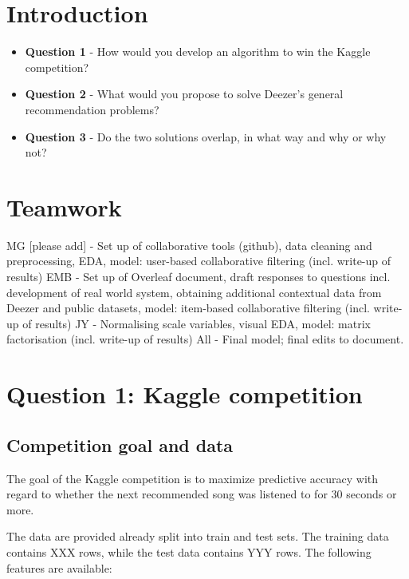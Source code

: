 \documentclass[
]{ceurart}
\begin{document}
\section{Introduction}



\begin{itemize}
    \item \textbf{Question 1} - How would you develop an algorithm to win the Kaggle competition?
    \item \textbf{Question 2} - What would you propose to solve Deezer's general recommendation problems?
    \item \textbf{Question 3} - Do the two solutions overlap, in what way and why or why not?
\end{itemize}


\section{Teamwork}

MG [please add] - Set up of collaborative tools (github), data cleaning and preprocessing, EDA, model: user-based collaborative filtering (incl. write-up of results)
EMB - Set up of Overleaf document, draft responses to questions incl. development of real world system, obtaining additional contextual data from Deezer and public datasets, model: item-based collaborative filtering (incl. write-up of results)
JY - Normalising scale variables, visual EDA, model: matrix factorisation (incl. write-up of results)
All - Final model; final edits to document.



\section{Question 1: Kaggle competition}

\subsection{Competition goal and data}

The goal of the Kaggle competition is to maximize predictive accuracy with regard to whether the next recommended song was listened to for 30 seconds or more.

The data are provided already split into train and test sets. The training data contains XXX rows, while the test data contains YYY rows. The following features are available:
\end{document}
